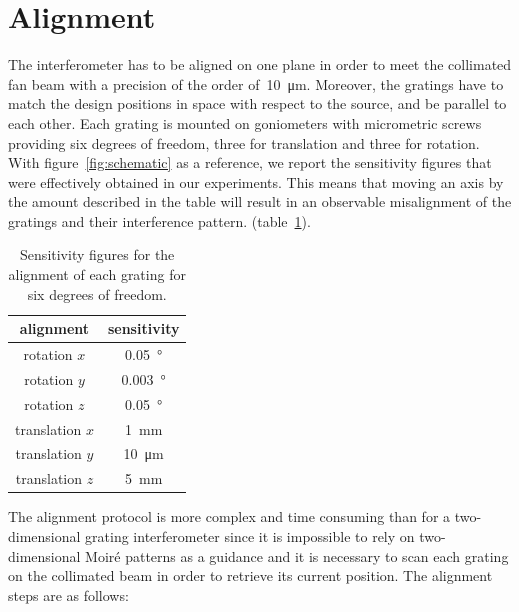 \section{Alignment}
The interferometer has to be aligned on one plane in order to meet the
collimated fan beam with a precision of the order of~\SI{10}{\micro\metre}.
Moreover, the gratings have to match the design positions in space with
respect to the source, and be parallel to each other.
Each grating is mounted on goniometers with micrometric screws providing six
degrees of freedom, three for translation and three for rotation.
With figure~\ref{fig:schematic} as a reference, we report the sensitivity
figures that were effectively obtained in our experiments. This means that
moving an axis by the amount described in the table will result in an
observable misalignment of the gratings and their interference pattern.
(table~\ref{tab:allineamento}).
\begin{table}[htb]
    \centering
    \begin{tabular}{*2c}
        \toprule
        alignment & sensitivity\\
        \midrule
        rotation $x$ & \SI{0.05}{\degree}\\
        rotation $y$ & \SI{0.003}{\degree}\\
        rotation $z$ & \SI{0.05}{\degree}\\
        translation $x$ & \SI{1}{\milli\metre}\\
        translation $y$ & \SI{10}{\micro\metre}\\
        translation $z$ & \SI{5}{\milli\metre}\\
        \bottomrule
    \end{tabular}
    \caption{Sensitivity figures for the alignment of each grating for six
    degrees of freedom.}
    \label{tab:allineamento}
\end{table}
The alignment protocol is more complex and time consuming than for a
two-dimensional grating interferometer since it is impossible to rely on
two-dimensional Moir\'e patterns as a guidance and it is necessary to scan
each grating on the collimated beam in order to retrieve its current position.
The alignment steps are as follows:

